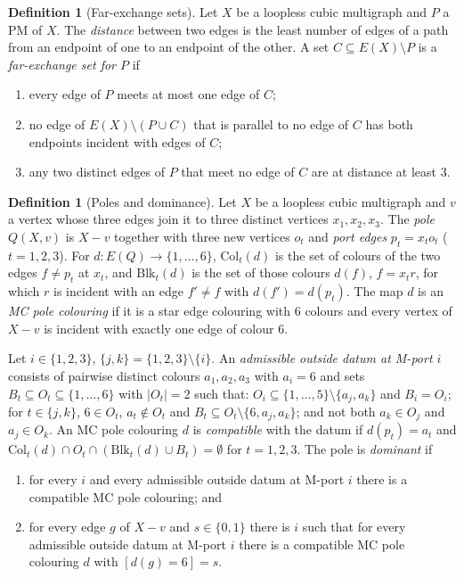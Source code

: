 \documentclass[11pt]{amsart}
\theoremstyle{definition}
\newtheorem{definition}[theorem]{Definition}
\theoremstyle{remark}
\newcommand{\Col}{\mathrm{Col}}
\newcommand{\Blk}{\mathrm{Blk}}
\begin{document}
\begin{definition}[Far-exchange sets]\label{def:fe}
Let $X$ be a loopless cubic multigraph and $P$ a PM of $X$. The \emph{distance} between two edges is the least number of edges of a path from an endpoint of one to an endpoint of the other. A set $C\subseteq E(X)\setminus P$ is a \emph{far-exchange set for $P$} if
\begin{enumerate}[label=(\alph*)]
\item every edge of $P$ meets at most one edge of $C$;
\item[(b$'$)] no edge of $E(X)\setminus(P\cup C)$ that is parallel to no edge of $C$ has both endpoints incident with edges of $C$;
\item[(c)] any two distinct edges of $P$ that meet no edge of $C$ are at distance at least $3$.
\end{enumerate}
\end{definition}

\begin{definition}[Poles and dominance]\label{def:pole}
Let $X$ be a loopless cubic multigraph and $v$ a vertex whose three edges join it to three distinct vertices $x_1,x_2,x_3$. The \emph{pole} $Q(X,v)$ is $X-v$ together with three new vertices $o_t$ and \emph{port edges} $p_t=x_to_t$ ($t=1,2,3$). For $d\colon E(Q)\to\{1,\dots,6\}$, $\Col_t(d)$ is the set of colours of the two edges $f\neq p_t$ at $x_t$, and $\Blk_t(d)$ is the set of those colours $d(f)$, $f=x_tr$, for which $r$ is incident with an edge $f'\ne f$ with $d(f')=d(p_t)$. The map $d$ is an \emph{MC pole colouring} if it is a star edge colouring with $6$ colours and every vertex of $X-v$ is incident with exactly one edge of colour $6$.

Let $i\in\{1,2,3\}$, $\{j,k\}=\{1,2,3\}\setminus\{i\}$. An \emph{admissible outside datum at M-port $i$} consists of pairwise distinct colours $a_1,a_2,a_3$ with $a_i=6$ and sets $B_t\subseteq O_t\subseteq\{1,\dots,6\}$ with $|O_t|=2$ such that: $O_i\subseteq\{1,\dots,5\}\setminus\{a_j,a_k\}$ and $B_i=O_i$; for $t\in\{j,k\}$, $6\in O_t$, $a_t\notin O_t$ and $B_t\subseteq O_t\setminus\{6,a_j,a_k\}$; and not both $a_k\in O_j$ and $a_j\in O_k$. An MC pole colouring $d$ is \emph{compatible} with the datum if $d(p_t)=a_t$ and $\Col_t(d)\cap O_t\cap(\Blk_t(d)\cup B_t)=\emptyset$ for $t=1,2,3$. The pole is \emph{dominant} if
\begin{enumerate}[label=(D\arabic*)]
\item for every $i$ and every admissible outside datum at M-port $i$ there is a compatible MC pole colouring; and
\item for every edge $g$ of $X-v$ and $s\in\{0,1\}$ there is $i$ such that for every admissible outside datum at M-port $i$ there is a compatible MC pole colouring $d$ with $[d(g)=6]=s$.
\end{enumerate}
\end{definition}
\end{document}

